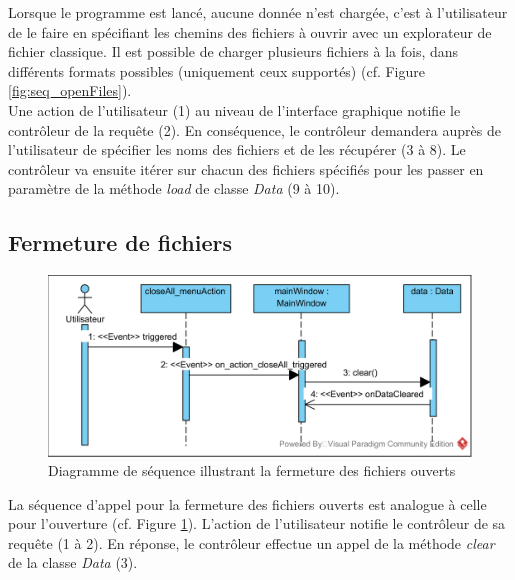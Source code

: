 \documentclass[12pt]{article}
\begin{document}
		Lorsque le programme est lancé, aucune donnée n’est chargée, c’est à l’utilisateur de le faire en spécifiant les chemins des fichiers à ouvrir avec un explorateur de fichier classique. Il est possible de charger plusieurs fichiers à la fois, dans différents formats possibles (uniquement ceux supportés) (cf. Figure \ref{fig:seq_openFiles}).\\
	Une action de l’utilisateur (1) au niveau de l’interface graphique notifie le contrôleur de la requête (2). En conséquence, le contrôleur demandera auprès de l’utilisateur de spécifier les noms des fichiers et de les récupérer (3 à 8). Le contrôleur va ensuite itérer sur chacun des fichiers spécifiés pour les passer en paramètre de la méthode \textit{load} de classe \textit{Data} (9 à 10).
	
		\newpage
		\subsection{Fermeture de fichiers}
		\begin{figure}[!h]
		\begin{center}
		\includegraphics[scale=1]{dia_sequence_closeFiles.png}
		\caption{Diagramme de séquence illustrant la fermeture des fichiers ouverts}
		\label{fig:seq_closeFiles}
		\end{center}
		\end{figure}
			
		La séquence d’appel pour la fermeture des fichiers ouverts est analogue à celle pour l’ouverture (cf. Figure \ref{fig:seq_closeFiles}). L’action de l’utilisateur notifie le contrôleur de sa requête (1 à 2). En réponse, le contrôleur effectue un appel de la méthode \textit{clear} de la classe \textit{Data} (3).
			
			
\end{document}
